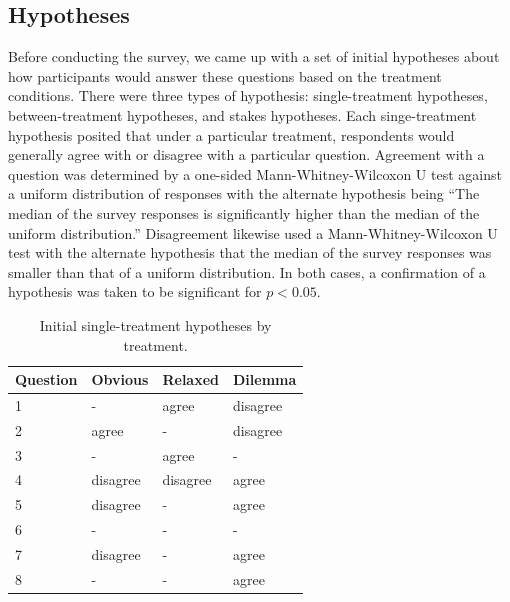 \subsection{Hypotheses}

Before conducting the survey, we came up with a set of initial hypotheses about how participants would answer these questions based on the treatment conditions.
%
There were three types of hypothesis: single-treatment hypotheses, between-treatment hypotheses, and stakes hypotheses.
%
Each singe-treatment hypothesis posited that under a particular treatment, respondents would generally agree with or disagree with a particular question.
%
Agreement with a question was determined by a one-sided Mann-Whitney-Wilcoxon U test \citep{Mann1947,Wilcoxon1945} against a uniform distribution of responses with the alternate hypothesis being ``The median of the survey responses is significantly higher than the median of the uniform distribution.''
%
Disagreement likewise used a Mann-Whitney-Wilcoxon U test with the alternate hypothesis that the median of the survey responses was smaller than that of a uniform distribution.
%
In both cases, a confirmation of a hypothesis was taken to be significant for $p < 0.05$.


\begin{table}
\bgroup
\def\arraystretch{1.1}
\begin{tabular}{l | l | l | l |}
Question & Obvious & Relaxed & Dilemma \\
\hline
1 &     -    &  agree   & disagree \\
\hline
2 &  agree   &     -    & disagree \\
\hline
3 &     -    &  agree   &     -    \\
\hline           
4 & disagree & disagree &  agree   \\
\hline
5 & disagree &     -    &  agree   \\
\hline
6 &     -    &     -    &     -    \\
\hline
7 & disagree &     -    &  agree   \\
\hline
8 &     -    &     -    &  agree   \\
\hline
\end{tabular}
\egroup
  \caption{Initial single-treatment hypotheses by treatment.}
  \label{tab:single-treatment}
\end{table}


